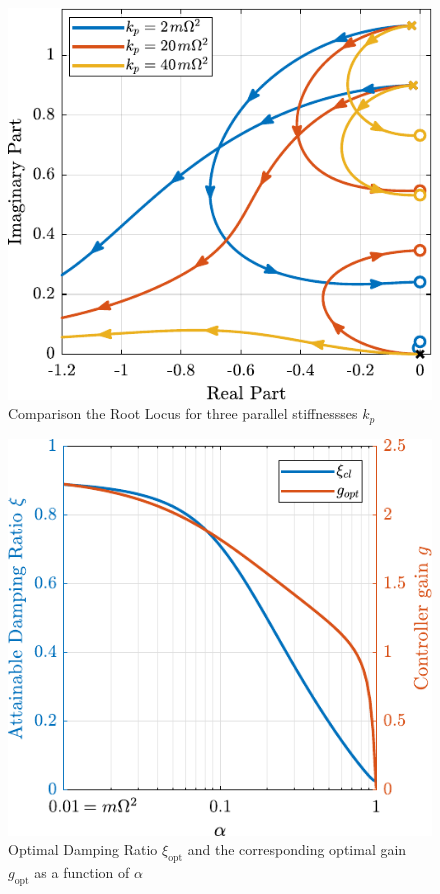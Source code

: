 \documentclass[Afour,sagev,times]{sagej}
\begin{document}
\begin{figure}[htbp]
\centering
\includegraphics[width=\linewidth]{figs/root_locus_iff_kps.pdf}
\caption{\label{fig:root_locus_iff_kps}Comparison the Root Locus for three parallel stiffnessses \(k_p\)}
\end{figure}


\begin{figure}[htbp]
\centering
\includegraphics[width=\linewidth]{figs/mod_iff_damping_kp.pdf}
\caption{\label{fig:mod_iff_damping_kp}Optimal Damping Ratio \(\xi_\text{opt}\) and the corresponding optimal gain \(g_\text{opt}\) as a function of \(\alpha\)}
\end{figure}
\end{document}

